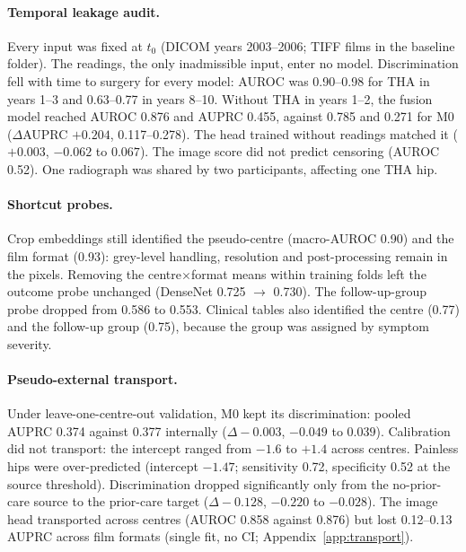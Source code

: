 \paragraph{Temporal leakage audit.}
Every input was fixed at $t_0$ (DICOM years 2003--2006; TIFF films in the baseline folder). The readings, the only
inadmissible input, enter no model. Discrimination fell with time to surgery for every model: AUROC was 0.90--0.98 for
THA in years 1--3 and 0.63--0.77 in years 8--10. Without THA in years 1--2, the fusion model reached AUROC 0.876 and
AUPRC 0.455, against 0.785 and 0.271 for M0 ($\Delta$AUPRC $+0.204$, 0.117--0.278). The head trained without readings
matched it ($+0.003$, $-0.062$ to $0.067$). The image score did not predict censoring (AUROC 0.52). One radiograph was
shared by two participants, affecting one THA hip.

\paragraph{Shortcut probes.}
Crop embeddings still identified the pseudo-centre (macro-AUROC 0.90) and the film format (0.93): grey-level handling,
resolution and post-processing remain in the pixels. Removing the centre$\times$format means within training folds
left the outcome probe unchanged (DenseNet 0.725 $\to$ 0.730). The follow-up-group probe dropped from 0.586 to 0.553.
Clinical tables also identified the centre (0.77) and the follow-up group (0.75), because the group was assigned by
symptom severity.

\paragraph{Pseudo-external transport.}
Under leave-one-centre-out validation, M0 kept its discrimination: pooled AUPRC 0.374 against 0.377 internally ($\Delta
-0.003$, $-0.049$ to $0.039$). Calibration did not transport: the intercept ranged from $-1.6$ to $+1.4$ across centres.
Painless hips were over-predicted (intercept $-1.47$; sensitivity 0.72, specificity 0.52 at the source threshold).
Discrimination dropped significantly only from the no-prior-care source to the prior-care target ($\Delta-0.128$,
$-0.220$ to $-0.028$). The image head transported across centres (AUROC 0.858 against 0.876) but lost
0.12--0.13 AUPRC across film formats (single fit, no CI; Appendix~\ref{app:transport}).
